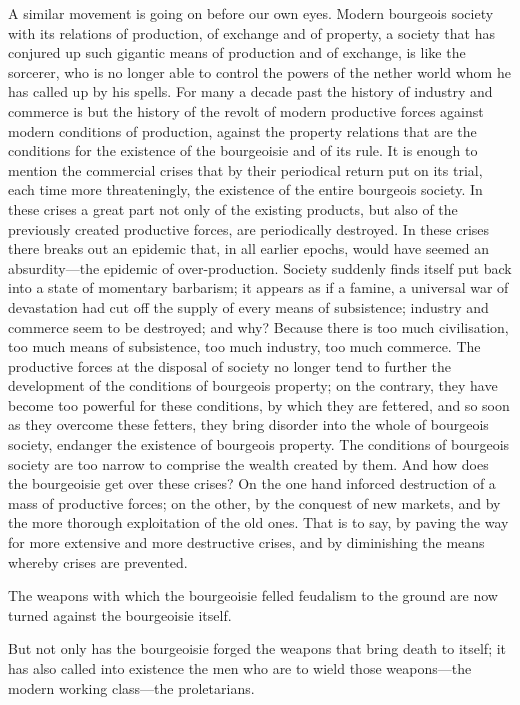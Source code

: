 \documentclass[, oneside]{article}   	%
\begin{document}
A similar movement is going on before our own eyes. Modern bourgeois society with its relations of production, of exchange and of property, a society that has conjured up such gigantic means of production and of exchange, is like the sorcerer, who is no longer able to control the powers of the nether world whom he has called up by his spells. For many a decade past the history of industry and commerce is but the history of the revolt of modern productive forces against modern conditions of production, against the property relations that are the conditions for the existence of the bourgeoisie and of its rule. It is enough to mention the commercial crises that by their periodical return put on its trial, each time more threateningly, the existence of the entire bourgeois society. In these crises a great part not only of the existing products, but also of the previously created productive forces, are periodically destroyed. In these crises there breaks out an epidemic that, in all earlier epochs, would have seemed an absurdity—the epidemic of over-production. Society suddenly finds itself put back into a state of momentary barbarism; it appears as if a famine, a universal war of devastation had cut off the supply of every means of subsistence; industry and commerce seem to be destroyed; and why? Because there is too much civilisation, too much means of subsistence, too much industry, too much commerce. The productive forces at the disposal of society no longer tend to further the development of the conditions of bourgeois property; on the contrary, they have become too powerful for these conditions, by which they are fettered, and so soon as they overcome these fetters, they bring disorder into the whole of bourgeois society, endanger the existence of bourgeois property. The conditions of bourgeois society are too narrow to comprise the wealth created by them. And how does the bourgeoisie get over these crises? On the one hand inforced destruction of a mass of productive forces; on the other, by the conquest of new markets, and by the more thorough exploitation of the old ones. That is to say, by paving the way for more extensive and more destructive crises, and by diminishing the means whereby crises are prevented.

The weapons with which the bourgeoisie felled feudalism to the ground are now turned against the bourgeoisie itself.

But not only has the bourgeoisie forged the weapons that bring death to itself; it has also called into existence the men who are to wield those weapons—the modern working class—the proletarians.
\end{document}
